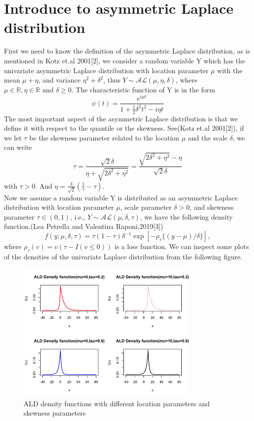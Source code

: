 \documentclass[mstat,12pt]{unswthesis}  %
\numberwithin{equation}{section}
\begin{document}
\section{Introduce to asymmetric Laplace distribution}
First we need to know the definition of the asymmetric Laplace distribution, as is mentioned in Kotz et.al 2001[2], we consider a random variable Y which has the univariate asymmetric Laplace distribution with location parameter $\mu$ with the mean $\mu+\eta$, and variance $\eta^2+\delta^2$, thus $Y\sim \mathcal{A} \mathcal{L}(\mu, \eta, \delta)$, where $\mu \in \mathbb{R}, \eta \in \mathbb{R} \text { and } \delta \geq 0$. The characteristic function of Y is in the form
\begin{equation}
    \psi(t)=\frac{e^{i \mu t}}{1+\frac{1}{2} \delta^{2} t^{2}-i \eta t}
\end{equation}
The most important aspect of the asymmetric Laplace distribution is that we define it with respect to the quantile or the skewness. See(Kotz et.al 2001[2]), if we let $\tau$ be the skewness parameter related to the location $\mu$ and the scale $\delta$, we can write 
\begin{equation}
    \tau=\frac{\sqrt{2} \delta}{\eta+\sqrt{2 \delta^{2}+\eta^{2}}}=\frac{\sqrt{2 \delta^{2}+\eta^{2}}-\eta}{\sqrt{2} \delta}
\end{equation}
with $\tau >0$. And $\eta=\frac{\delta}{\sqrt{2}}\left(\frac{1}{\tau}-\tau\right)$. \\
Now we assume a random variable Y is distributed as an asymmetric Laplace distribution with location parameter $\mu$, scale parameter $\delta>0$, and skewness parameter $\tau \in (0,1)$, i.e., $Y \sim \mathcal{A} \mathcal{L}(\mu,\delta,\tau)$, we have the following density function.(Lea Petrella and Valentina Raponi,2019[3])
\begin{equation}
    f(y;\mu,\delta,\tau) = \tau(1-\tau)\delta^{-1}\exp[-\rho_\tau\{(y-\mu)/\delta\}],
\end{equation} where $\rho_{\tau}(v)=v(\tau-I(v \leqslant 0))$ is a loss function.
We can inspect some plots of the densities of the univariate Laplace distribution from the following figure.
\begin{figure}[h]
\centering
\includegraphics[width=0.8\textwidth]{Rplot01.png}
\caption{\label{fig:bar}ALD density functions with different location parameters and skewness parameters}
\end{figure}
\end{document}
